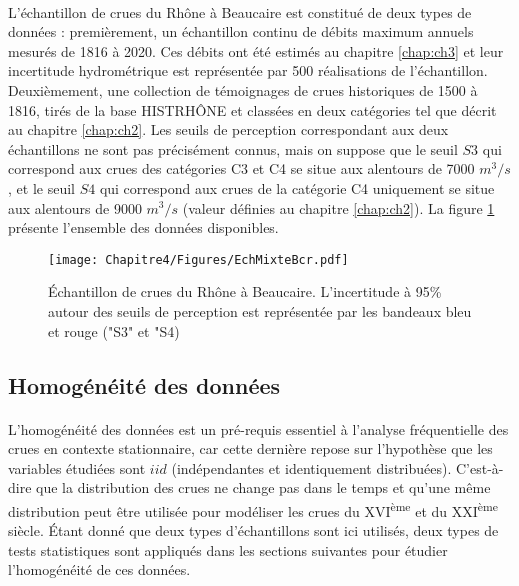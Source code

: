 	\paragraph{} L'échantillon de crues du Rhône à Beaucaire est constitué de deux types de données : premièrement, un échantillon continu de débits maximum annuels mesurés de 1816 à 2020. Ces débits ont été estimés au chapitre \ref{chap:ch3} et leur incertitude hydrométrique est représentée par 500 réalisations de l'échantillon. Deuxièmement, une collection de témoignages de crues historiques de 1500 à 1816, tirés de la base HISTRHÔNE et classées en deux catégories tel que décrit au chapitre \ref{chap:ch2}. Les seuils de perception correspondant aux deux échantillons ne sont pas précisément connus, mais on suppose que le seuil $S3$ qui correspond aux crues des catégories C3 et C4 se situe aux alentours de 7000 $m^3/s$, et le seuil $S4$ qui correspond aux crues de la catégorie C4 uniquement se situe aux alentours de 9000 $m^3/s$ (valeur définies au chapitre \ref{chap:ch2}). La figure \ref{fig:EchMixte} présente l'ensemble des données disponibles. 
	
	\begin{figure}[h]
		\texttt{[image: Chapitre4/Figures/EchMixteBcr.pdf]}	
		\caption{Échantillon de crues du Rhône à Beaucaire. L'incertitude à 95\% autour des seuils de perception est représentée par les bandeaux bleu et rouge ("S3" et "S4)}
		\label{fig:EchMixte}
	\end{figure}
	

	\subsection{Homogénéité des données}
	\label{subsec:homog}
	\paragraph{} L'homogénéité des données est un pré-requis essentiel à l'analyse fréquentielle des crues en contexte stationnaire, car cette dernière repose sur l'hypothèse que les variables étudiées sont $iid$ (indépendantes et identiquement distribuées). C'est-à-dire que la distribution des crues ne change pas dans le temps et qu'une même distribution peut être utilisée pour modéliser les crues du XVI\textsuperscript{ème} et du XXI\textsuperscript{ème} siècle. Étant donné que deux types d'échantillons sont ici utilisés, deux types de tests statistiques sont appliqués dans les sections suivantes pour étudier l'homogénéité de ces données. 

